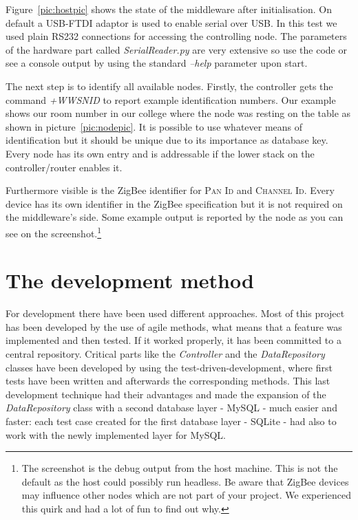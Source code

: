 Figure~\ref{pic:hostpic} shows the state of the middleware after initialisation. On default a USB-FTDI adaptor is used to enable serial over USB.
In this test we used plain RS232 connections for accessing the controlling node. The parameters of the hardware part called \textit{SerialReader.py}
are very extensive so use the code or see a console output by using the standard \textit{--help} parameter upon start.

The next step is to identify all available nodes. Firstly, the controller gets the command \textit{+WWSNID} to report example identification numbers.
Our example shows our room number in our college where the node was resting on the table as shown in picture~\ref{pic:nodepic}. It is possible 
to use whatever means of identification but it should be unique due to its importance as database key. Every node has its own 
entry and is addressable if the lower stack on the controller/router enables it.

Furthermore visible is the ZigBee identifier for \textsc{Pan Id} and \textsc{Channel Id}. Every device has its own identifier in the ZigBee specification
but it is not required on the middleware's side. Some example output is reported by the node as you can see on the screenshot.\footnote{The screenshot
    is the debug output from the host machine. This is not the default as the host could possibly run headless. Be aware that ZigBee devices may influence
other nodes which are not part of your project. We experienced this quirk and had a lot of fun to find out why.}

\newpage
\section{The development method}

For development there have been used different approaches. Most of this project has been developed by the use of agile methods, 
what means that a feature was implemented and then tested. If it worked properly, it has been committed to a central repository. 
Critical parts like the \textit{Controller} and the \textit{DataRepository} classes have been developed by using the test-driven-development, 
where first tests have been written and afterwards the corresponding methods. This last development technique had their advantages and made 
the expansion of the \textit{DataRepository} class with a second database layer - MySQL - much easier and faster: each test case 
created for the first database layer - SQLite - had also to work with the newly implemented layer for MySQL.

